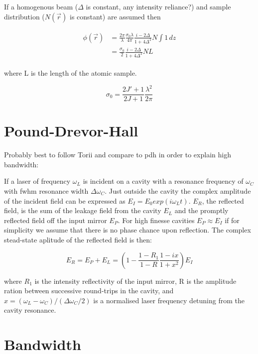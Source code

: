 \documentclass{article}
\begin{document}
\begin{multicols}{2}
If a homogenous beam ($\Delta$ is constant, any intensity reliance?) and sample distribution ($N(\vec{r})$ is constant) are assumed then

\begin{align}\begin{split}
\phi (\vec{r}) &= \frac{2\pi}{\lambda} \frac{\sigma_0 \lambda}{4 \pi} \frac{i-2\Delta}{1+4\Delta^2} N \int 1 \,dz\\
&= \frac{\sigma_0}{2} \frac{i-2\Delta}{1+4\Delta^2} N L
\end{split}\end{align}

where L is the length of the atomic sample.

\begin{equation}
\sigma_0 = \frac{2J' + 1}{2J+1} \frac{\lambda^2}{2\pi}
\end{equation}

\section{Pound-Drevor-Hall}
Probably best to follow Torii and compare to \gls{pdh} in order to explain high bandwidth:

If a laser of frequency $\omega_{L}$ is incident on a cavity with a resonance frequency of $\omega_{C}$ with \gls{fwhm} resonance width $\Delta\omega_{C}$. Just outside the cavity the complex amplitude of the incident field can be expressed as $E_{I} = E_{0}exp(i\omega_{L}t)$. $E_{R}$, the reflected field, is the sum of the leakage field from the cavity $E_{L}$ and the promptly reflected field off the input mirror $E_{P}$. For high finesse cavities $E_P \approx E_I$ if for simplicity we assume that there is no phase chance upon reflection. The complex stead-state aplitude of the reflected field is then:

\begin{equation}
    E_R = E_P + E_L = \left( 1 - \frac{1-R_1}{1-R} \frac{1-ix}{1+x^2} \right) E_I
\end{equation}

where $R_1$ is the intensity reflectivity of the input mirror, R is the amplitude ration between successive round-trips in the cavity, and $x = (\omega_L - \omega_C) / (\Delta\omega_C/2)$ is a normalised laser frequency detuning from the cavity resonance.


\section{Bandwidth}


\end{multicols}
\end{document}

